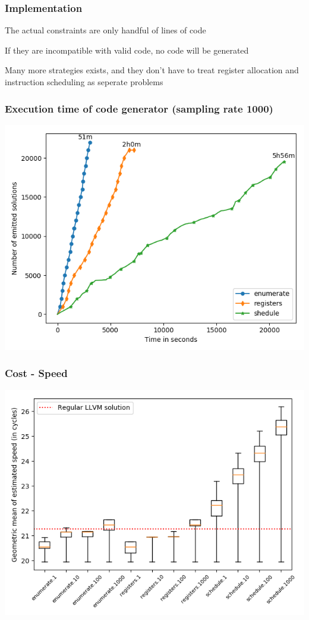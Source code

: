 \begin{frame}
	\frametitle{Implementation}
	
	The actual constraints are only handful of lines of code

	\vspace{0.5cm}

	If they are incompatible with valid code, no code will be generated

	\vspace{0.5cm}

	Many more strategies exists, and they don't have to treat register allocation and instruction scheduling as seperate problems

\end{frame}

\begin{frame}
	\frametitle{Execution time of code generator (sampling rate 1000)}

	\includegraphics[width=\textwidth]{../results/figures/generator_time}

\end{frame}

\begin{frame}
	\frametitle{Cost - Speed}

	\includegraphics[width=\textwidth]{../results/figures/cost_speed}

\end{frame}

